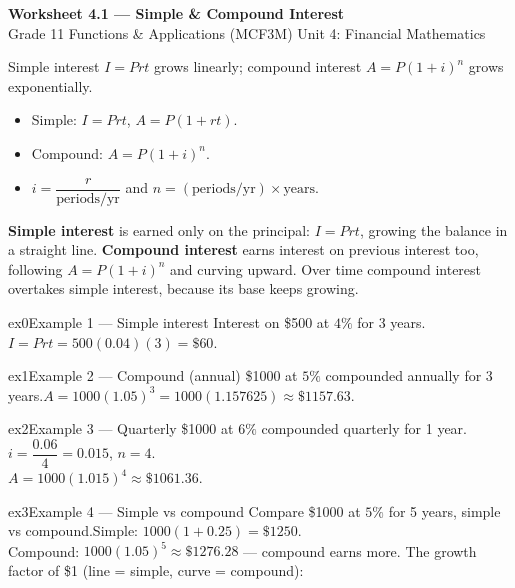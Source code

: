 \documentclass[11pt]{article}
\begin{document}
\begin{center}
{\LARGE\bfseries\color{titleblue}Worksheet 4.1 --- Simple \& Compound Interest}\\[2pt]
{\small Grade 11 Functions \& Applications (MCF3M) \textperiodcentered{} Unit 4: Financial Mathematics}
\end{center}

\begin{ideabox}
Simple interest $I=Prt$ grows linearly; compound interest $A=P(1+i)^n$ grows exponentially.
\begin{itemize}[leftmargin=*,itemsep=2pt]
  \item Simple: $I=Prt$, $A=P(1+rt)$.
  \item Compound: $A=P(1+i)^n$.
  \item $i=\dfrac{r}{\text{periods/yr}}$ and $n=(\text{periods/yr})\times\text{years}$.
\end{itemize}
\end{ideabox}

\begin{learnbox}
\textbf{Simple interest} is earned only on the principal: $I=Prt$, growing the balance in a straight line.
\textbf{Compound interest} earns interest on previous interest too, following $A=P(1+i)^n$ and curving upward.
Over time compound interest overtakes simple interest, because its base keeps growing.
\end{learnbox}


\begin{example}{ex0}{Example 1 --- Simple interest}
Interest on \$500 at $4\%$ for 3 years.\soln $I=Prt=500(0.04)(3)=\$60$.
\end{example}

\begin{example}{ex1}{Example 2 --- Compound (annual)}
\$1000 at $5\%$ compounded annually for 3 years.\soln $A=1000(1.05)^3=1000(1.157625)\approx\$1157.63$.
\end{example}

\begin{example}{ex2}{Example 3 --- Quarterly}
\$1000 at $6\%$ compounded quarterly for 1 year.\soln $i=\dfrac{0.06}{4}=0.015$, $n=4$. \\ $A=1000(1.015)^4\approx\$1061.36$.
\end{example}

\begin{example}{ex3}{Example 4 --- Simple vs compound}
Compare \$1000 at $5\%$ for 5 years, simple vs compound.\soln Simple: $1000(1+0.25)=\$1250$. \\ Compound: $1000(1.05)^5\approx\$1276.28$ — compound earns more. The growth factor of \$1 (line = simple, curve = compound):
\end{example}
\end{document}
